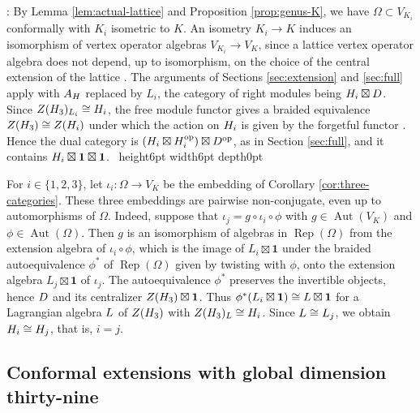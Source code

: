 \documentclass[leqno]{article}
\let\cal\relax
\newcommand{\cal}{\mathcal}
\newcommand{\qed}{\hfill \vrule height6pt  width6pt depth0pt}
\newcommand{\co}{\colon}
\DeclareMathOperator{\Rep}{Rep}
\newenvironment{proof}[1][]{\noindent {\it Proof #1} : }{\hbox{~}\qed
\smallskip
}
\numberwithin{equation}{section}
\begin{document}
\begin{proof}
By Lemma \ref{lem:actual-lattice} and Proposition \ref{prop:genus-K}, we have $\Omega \subset V_{K_i}$ conformally with $K_i$ isometric to $K$. An isometry $K_i \to K$ induces an isomorphism of vertex operator algebras $V_{K_i} \to V_K$, since a lattice vertex operator algebra does not depend, up to isomorphism, on the choice of the central extension of the lattice \cite[Proposition 6.5.5 p.~244]{LL04}. The arguments of Sections \ref{sec:extension} and \ref{sec:full} apply with $\cal A_{\cal H}$ replaced by $L_i$, the category of right modules being $\cal H_i \boxtimes \cal D$. Since $Z(\cal H_3)_{L_i} \cong \cal H_i$, the free module functor gives a braided equivalence $Z(\cal H_3) \cong Z(\cal H_i)$ under which the action on $\cal H_i$ is given by the forgetful functor \cite[Proposition 2.2(1) p.~10]{Arh26b}. Hence the dual category is $(\cal H_i \boxtimes \cal H_i^{\mathrm{op}}) \boxtimes \cal D^{\mathrm{op}}$, as in Section \ref{sec:full}, and it contains $\cal H_i \boxtimes \mathbf 1 \boxtimes \mathbf 1$.
\end{proof}

For $i \in \{1,2,3\}$, let $\iota_i \co \Omega \to V_K$ be the embedding of Corollary \ref{cor:three-categories}. These three embeddings are pairwise non-conjugate, even up to automorphisms of $\Omega$. Indeed, suppose that $\iota_j = g \circ \iota_i \circ \phi$ with $g \in \operatorname{Aut}(V_K)$ and $\phi \in \operatorname{Aut}(\Omega)$. Then $g$ is an isomorphism of algebras in $\Rep(\Omega)$ from the extension algebra of $\iota_i \circ \phi$, which is the image of $L_i \boxtimes \mathbf 1$ under the braided autoequivalence $\phi^*$ of $\Rep(\Omega)$ given by twisting with $\phi$, onto the extension algebra $L_j \boxtimes \mathbf 1$ of $\iota_j$. The autoequivalence $\phi^*$ preserves the invertible objects, hence $\cal D$ and its centralizer $Z(\cal H_3) \boxtimes \mathbf 1$. Thus $\phi^*(L_i \boxtimes \mathbf 1) \cong \cal L \boxtimes \mathbf 1$ for a Lagrangian algebra $\cal L$ of $Z(\cal H_3)$ with $Z(\cal H_3)_{\cal L} \cong \cal H_i$. Since $\cal L \cong L_j$, we obtain $\cal H_i \cong \cal H_j$, that is, $i = j$.

\subsection{Conformal extensions with global dimension thirty-nine}
\label{subsec:dimension39-extensions}
\end{document}
